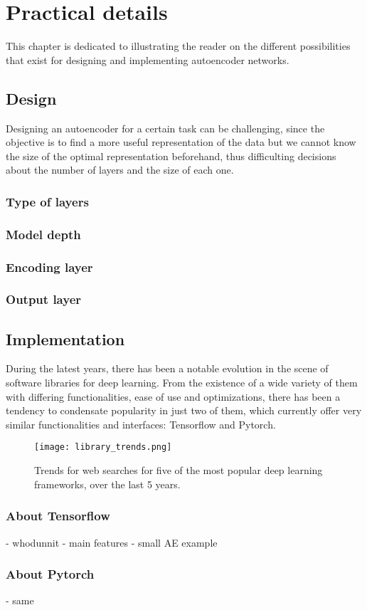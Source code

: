 \setchapterpreamble[u]{\margintoc}
\chapter{Practical details}

This chapter is dedicated to illustrating the reader on the different possibilities that exist for designing and implementing autoencoder networks.

\section{Design}

Designing an autoencoder for a certain task can be challenging, since the objective is to find a more useful representation of the data but we cannot know the size of the optimal representation beforehand, thus difficulting decisions about the number of layers and the size of each one.

\subsection{Type of layers}

\subsection{Model depth}

\subsection{Encoding layer}

\subsection{Output layer}


\section{Implementation}

During the latest years, there has been a notable evolution in the scene of software libraries for deep learning. From the existence of a wide variety of them with differing functionalities, ease of use and optimizations, there has been a tendency to condensate popularity in just two of them, which currently offer very similar functionalities and interfaces: Tensorflow and Pytorch.

\begin{figure*}[htbp]
    \centering  
    \texttt{[image: library\_trends.png]}
    \caption{Trends for web searches for five of the most popular deep learning frameworks, over the last 5 years.}
    \label{fig:trends}
\end{figure*}

\subsection{About Tensorflow}

- whodunnit
- main features
- small AE example

\subsection{About Pytorch}

- same